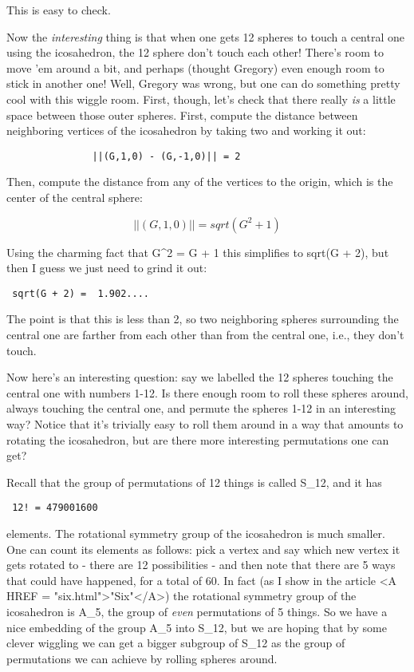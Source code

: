 This is easy to check.  

Now the \emph{interesting} thing is that when one gets 12 spheres to touch a
central one using the icosahedron, the 12 sphere don't touch each other!
There's room to move 'em around a bit, and perhaps (thought Gregory)
even enough room to stick in another one!  Well, Gregory was wrong, but
one can do something pretty cool with this wiggle room.  First, though,
let's check that there really \emph{is} a little space between those outer
spheres.  First, compute the distance between neighboring vertices of
the icosahedron by taking two and working it out:

\begin{verbatim}
               ||(G,1,0) - (G,-1,0)|| = 2
\end{verbatim}
    

Then, compute the distance from any of the vertices to the origin, which
is the center of the central sphere:

$$
               ||(G,1,0)|| = sqrt(G^{2} + 1)
$$
    

Using the charming fact that G^{2} = G + 1 this simplifies to
sqrt(G + 2), but then I guess we just need to grind it out:

\begin{verbatim}
 sqrt(G + 2) =  1.902....
\end{verbatim}
    

The point is that this is less than 2, so two neighboring spheres
surrounding the central one are farther from each other than from the
central one, i.e., they don't touch.

Now here's an interesting question: say we labelled the 12 spheres
touching the central one with numbers 1-12.  Is there enough room to
roll these spheres around, always touching the central one, and permute
the spheres 1-12 in an interesting way?  Notice that it's trivially easy
to roll them around in a way that amounts to rotating the icosahedron,
but are there more interesting permutations one can get?

Recall that the group of permutations of 12 things is called S_{12}, and
it has 

\begin{verbatim}
 12! = 479001600
\end{verbatim}
    


elements.  The rotational symmetry group of the icosahedron is much
smaller.  One can count its elements as follows: pick a vertex and say
which new vertex it gets rotated to - there are 12 possibilities - and
then note that there are 5 ways that could have happened, for a total of
60.  In fact (as I show in the article <A HREF = "six.html">"Six"</A>)
the rotational symmetry group of the icosahedron is A_{5}, the
group of \emph{even} permutations of 5 things.  So we have a nice
embedding of the group A_{5} into S_{12}, but we are
hoping that by some clever wiggling we can get a bigger subgroup of
S_{12} as the group of permutations we can achieve by rolling
spheres around.

